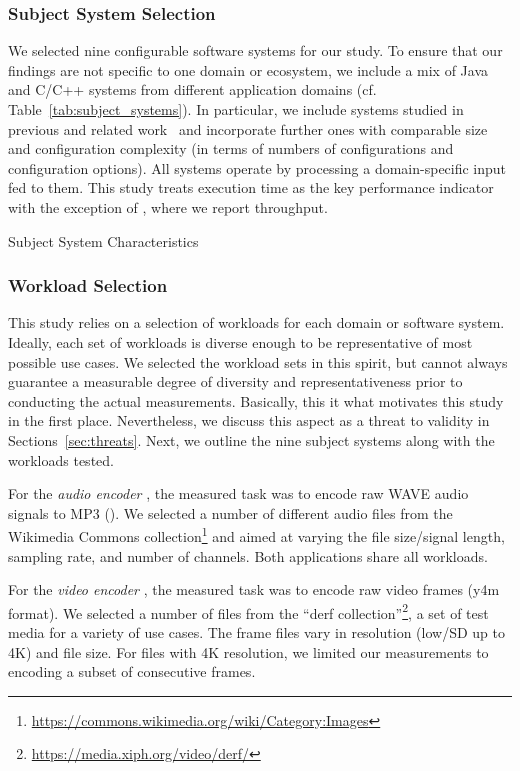 {\subsubsection{Subject System Selection}
{\color{edited}
We selected nine configurable software systems for our study. To ensure that our findings are not specific to one domain or ecosystem, we include a mix of Java and C/C++ systems from different application domains (cf. Table~\ref{tab:subject_systems}). In particular, we include systems studied in previous and related work~\cite{velez_2020_configcrusher_jase,weber_white_2021,alves_sampling_2020} and incorporate further ones with comparable size and configuration complexity (in terms of numbers of configurations and configuration options). All systems operate by processing a domain-specific input fed to them. This study treats execution time as the key performance indicator with the exception of \htwo, where we report throughput.

\begin{table}
	\footnotesize
	\centering
	\caption{Subject System Characteristics}
	
	\label{tab:subject_systems}
\end{table}

\subsubsection{Workload Selection}
This study relies on a selection of workloads for each domain or software system. Ideally, each set of workloads is diverse enough to be representative of most possible use cases. We selected the workload sets in this spirit, but cannot always guarantee a measurable degree of diversity and representativeness prior to conducting the actual measurements. Basically, this it what motivates this study in the first place. Nevertheless, we discuss this aspect as a threat to validity in Sections~\ref{sec:threats}. Next, we outline the nine subject systems along with the workloads tested. 

For the \textit{audio encoder} \jumper, the measured task was to encode raw WAVE audio signals to MP3 (\jumper). We selected a number of different audio files from the Wikimedia Commons collection\footnote{\url{https://commons.wikimedia.org/wiki/Category:Images}} and aimed at varying the file size/signal length, sampling rate, and number of channels. Both applications share all workloads.

For the \textit{video encoder} \xzwo, the measured task was to encode raw video frames (y4m format). We selected a number of files from the “derf collection”\footnote{\url{https://media.xiph.org/video/derf/}}, a set of test media for a variety of use cases. The frame files vary in resolution (low/SD up to 4K) and file size. For files with 4K resolution, we limited our measurements to encoding a subset of consecutive frames.

}}
